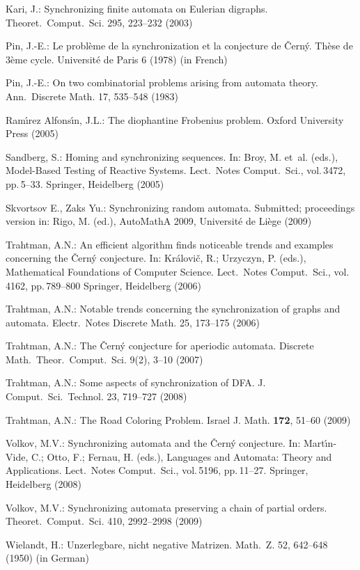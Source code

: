 \documentclass[11pt]{article}
\begin{document}
\begin{thebibliography}{99}
Kari, J.: Synchronizing finite automata on Eulerian digraphs.
Theoret.\ Comput.\ Sci. 295, 223--232 (2003)

Pin, J.-E.: Le probl\`eme de la synchronization et la conjecture de
\v{C}ern\'y. Th\`ese de 3\`eme cycle. Universit\'e de Paris 6 (1978) (in
French)

Pin, J.-E.: On two combinatorial problems arising from automata
theory. Ann.\ Discrete Math. 17, 535--548 (1983)

Ram\'{\i}rez Alfons\'{\i}n, J.L.: The diophantine Frobenius problem.
Oxford University Press (2005)

Sandberg, S.: Homing and synchronizing sequences. In: Broy, M.
et~al. (eds.), Model-Based Testing of Reactive Systems. Lect.\
Notes Comput.\ Sci., vol.\,3472, pp.\,5--33. Springer, Heidelberg
(2005)

Skvortsov E., Zaks Yu.: Synchronizing random automata. Submitted;
proceedings version in: Rigo, M. (ed.), AutoMathA 2009, Universit\'e
de Li\`ege (2009)

Trahtman, A.N.: An efficient algorithm finds noticeable trends
and examples concerning the \v{C}ern\'y conjecture. In:
Kr\'alovi\v{c}, R.; Urzyczyn, P. (eds.), Mathematical Foundations
of Computer Science. Lect.\ Notes Comput.\ Sci., vol.\,4162, pp.\,789--800
Springer, Heidelberg (2006)

Trahtman, A.N.: Notable trends concerning the synchronization
of graphs and automata. Electr.\ Notes Discrete Math. 25, 173--175 (2006)

Trahtman, A.N.: The \v{C}ern\'y conjecture for aperiodic automata.
Discrete Math.\ Theor.\ Comput.\ Sci. 9(2), 3--10 (2007)

Trahtman, A.N.: Some aspects of synchronization of DFA. J. Comput.\ Sci.\
Technol. 23, 719--727 (2008)

Trahtman, A.N.: The Road Coloring Problem. Israel J. Math.
\textbf{172}, 51--60 (2009)

Volkov, M.V.: Synchronizing automata and the \v{C}ern\'{y}
conjecture. In: Mart\'\i{}n-Vide, C.; Otto, F.; Fernau, H. (eds.),
Languages and Automata: Theory and Applications. Lect.\ Notes
Comput.\ Sci., vol.\,5196, pp.\,11--27.  Springer, Heidelberg (2008)

\bibitem{Vo09}
Volkov, M.V.: Synchronizing automata preserving a chain of partial
orders. Theoret.\ Comput.\ Sci. 410, 2992--2998 (2009)

Wielandt, H.: Unzerlegbare, nicht negative Matrizen. Math.\ Z.
52, 642--648 (1950) (in German)
\end{thebibliography}
\end{document}
